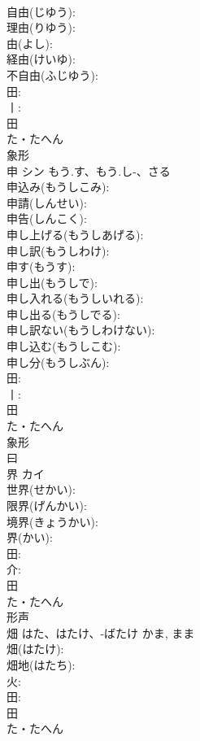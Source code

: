 \documentclass[8pt]{extreport}
\begin{document}
\begin{CJK}{UTF8}{min}
\\	自由(じゆう): 
\\	理由(りゆう): 
\\	由(よし): 
\\	経由(けいゆ): 
\\	不自由(ふじゆう): 
\\	田: 
\\	丨: 
\\	田	
\\	た・たへん	
\\	象形 
\\	申	シン	もう.す、もう.し-、さる		
\\	申込み(もうしこみ): 
\\	申請(しんせい): 
\\	申告(しんこく): 
\\	申し上げる(もうしあげる): 
\\	申し訳(もうしわけ): 
\\	申す(もうす): 
\\	申し出(もうしで): 
\\	申し入れる(もうしいれる): 
\\	申し出る(もうしでる): 
\\	申し訳ない(もうしわけない): 
\\	申し込む(もうしこむ): 
\\	申し分(もうしぶん): 
\\	田: 
\\	丨: 
\\	田	
\\	た・たへん	
\\	象形 
\\	曰 
\\	界	カイ			
\\	世界(せかい): 
\\	限界(げんかい): 
\\	境界(きょうかい): 
\\	界(かい): 
\\	田: 
\\	介: 
\\	田	
\\	た・たへん	
\\	形声 
\\	畑		はた、はたけ、-ばたけ	かま, まま	
\\	畑(はたけ): 
\\	畑地(はたち): 
\\	火: 
\\	田: 
\\	田	
\\	た・たへん	

\end{CJK}
\end{document}
